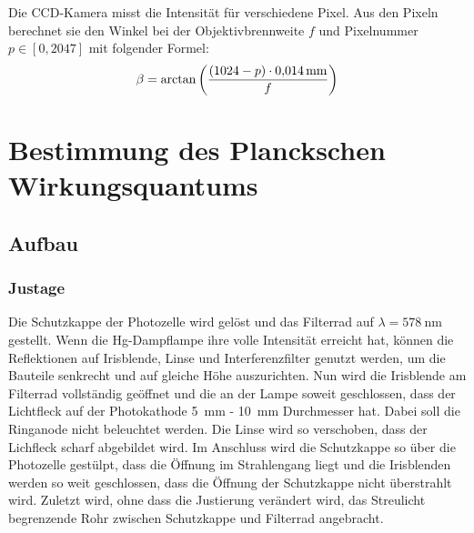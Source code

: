 Die CCD-Kamera misst die Intensität für verschiedene Pixel. Aus den Pixeln
berechnet sie den Winkel bei der Objektivbrennweite $f$ und Pixelnummer $p \in
[0, 2047]$ mit folgender Formel:
\[
    \beta = \arctan\del{\frac{(1024 - p) \cdot \SI{0.014}{\milli\meter}}f}
\]


\FloatBarrier
\section{Bestimmung des Planckschen Wirkungsquantums}

\FloatBarrier
\subsection{Aufbau}

\begin{figure}[htbp]
    \centering
    \caption{%
        \cite[Abbildung~P402.1]{physik412-Anleitung}
    }
    \label{fig:P402.1}
\end{figure}

\FloatBarrier
\subsubsection{Justage}

Die Schutzkappe der Photozelle wird gelöst und das Filterrad auf $\lambda =
\SI{578}{\nano\meter}$ gestellt. Wenn die Hg-Dampflampe ihre volle Intensität
erreicht hat, können die Reflektionen auf Irisblende, Linse und
Interferenzfilter genutzt werden, um die Bauteile senkrecht und auf gleiche
Höhe auszurichten. Nun wird die Irisblende am Filterrad vollständig geöffnet
und die an der Lampe soweit geschlossen, dass der Lichtfleck auf der
Photokathode \SI{5}{\milli\meter} - \SI{10}{\milli\meter} Durchmesser hat.
Dabei soll die Ringanode nicht beleuchtet werden. Die Linse wird so verschoben,
dass der Lichfleck scharf abgebildet wird.
Im Anschluss wird die Schutzkappe so über die Photozelle gestülpt, dass
die Öffnung im Strahlengang liegt und die Irisblenden werden so weit
geschlossen, dass die Öffnung der Schutzkappe nicht überstrahlt wird.
Zuletzt wird, ohne dass die Justierung verändert wird, das Streulicht
begrenzende Rohr zwischen Schutzkappe und Filterrad angebracht.

